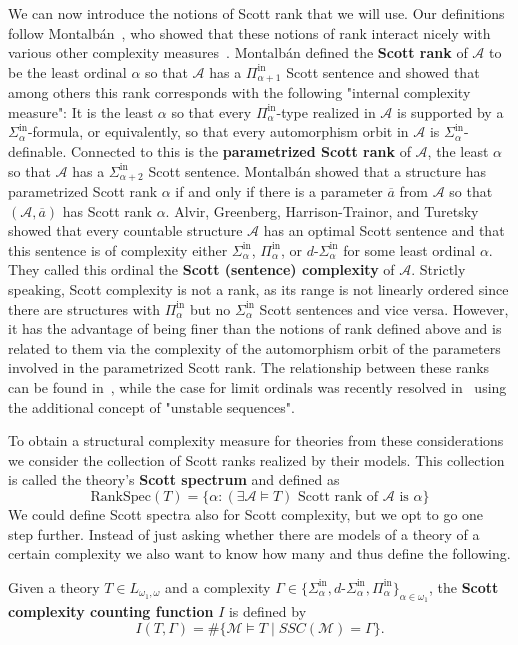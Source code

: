 \documentclass[11pt]{amsart}
\newcommand{\A}{\mathcal{A}}
\newcommand{\mc}[1]{\mathcal{#1}}
\newcommand{\Pinf}[1]{\Pi^{\mathrm{in}}_{#1}}
\newcommand{\Sinf}[1]{\Sigma^{\mathrm{in}}_{#1}}
\newcommand{\dSinf}[1]{d\text{-}\Sigma^{\mathrm{in}}_{#1}}
\newcommand{\SSprank}{\mathrm{RankSpec}}
\def\om{\omega}
\def\A{\mathcal A}
\def\Lomom{L_{\om_1,\om}}
\theoremstyle{remark}
\newcommand{\define}[1]{\textbf{#1}}
\newcommand{\ba}{\overline{a}}
\begin{document}
We can now introduce the notions of Scott rank that we will use. Our definitions follow Montalbán~\cite{MonSR}, who showed that these notions of rank interact nicely with various other complexity measures~\cite{MonSR}. Montalbán defined the \define{Scott rank} of $\A$ to be the least ordinal $\alpha$ so that $\A$ has a $\Pinf{\alpha+1}$ Scott sentence and showed that among others this rank corresponds with the following "internal complexity measure": It is the least $\alpha$ so that every $\Pinf{\alpha}$-type realized in $\A$ is supported by a $\Sinf{\alpha}$-formula, or equivalently, so that every automorphism orbit in $\A$ is $\Sinf{\alpha}$-definable. Connected to this is the \define{parametrized Scott rank} of $\A$, the least $\alpha$ so that $\A$ has a $\Sinf{\alpha+2}$ Scott sentence. Montalbán showed that a structure has parametrized Scott rank $\alpha$ if and only if there is a parameter $\ba$ from $\A$ so that $(\A,\ba)$ has Scott rank $\alpha$. Alvir, Greenberg, Harrison-Trainor, and Turetsky~\cite{AGNHTT} showed that every countable structure $\A$ has an optimal Scott sentence and that this sentence is of complexity either $\Sinf{\alpha}$, $\Pinf{\alpha}$, or $\dSinf{\alpha}$ for some least ordinal $\alpha$. They called this ordinal the \define{Scott (sentence) complexity} of $\A$. Strictly speaking, Scott complexity is not a rank, as its range is not linearly ordered since there are structures with $\Pinf{\alpha}$ but no $\Sinf{\alpha}$ Scott sentences and vice versa. However, it has the advantage of being finer than the notions of rank defined above and is related to them via the complexity of the automorphism orbit of the parameters involved in the parametrized Scott rank. The relationship between these ranks can be found in~\cite{MBook}, while the case for limit ordinals was recently resolved in~\cite{GR23} using the additional concept of "unstable sequences".

To obtain a structural complexity measure for theories from these considerations we consider the collection of Scott ranks realized by their models. This collection is called the theory's \define{Scott spectrum} and defined as
\[ \SSprank(T)=\{\alpha : (\exists \A\models T) \text{ Scott rank of $\A$ is $\alpha$}\}
\]
We could define Scott spectra also for Scott complexity, but we opt to go one step further. Instead of just asking whether there are models of a theory of a certain complexity we also want to know how many and thus define the following.
\begin{definition}
	Given a theory $T\in\Lomom$ and a complexity $\Gamma\in\{\Sinf{\alpha},\dSinf{\alpha},\Pinf{\alpha}\}_{\alpha\in\omega_1}$, the \define{Scott complexity counting function} $I$ is defined by
    \[ I(T,\Gamma) = \# \{\mc{M}\models T\mid SSC(\mc{M})=\Gamma\} .\]
\end{definition}
\end{document}
